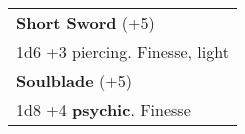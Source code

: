 \documentclass[twocolumn]{article}
\begin{document}
%

\vspace{40pt}

\\
\noindent\begin{tabular}{|m{3.1in}|}
\hline
\textbf{Short Sword} (+5) \\
1d6 +3 piercing. Finesse, light \\
\textbf{Soulblade} (+5) \\
1d8 +4 \textbf{psychic}. Finesse \\

\hline
\end{tabular}
\vspace{8pt}
\end{document}
